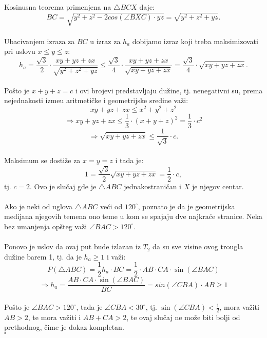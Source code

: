 \documentclass[11pt,letter]{article}
\begin{document}
\indent Kosinusna teorema primenjena na $\bigtriangleup BCX$ daje:
\\
$$BC=\sqrt{y^2+z^2-2cos(\angle BXC)\cdot yz}=\sqrt{y^2+z^2+yz}.$$
\\
\indent Ubacivanjem izraza za $BC$ u izraz za $h_a$ dobijamo izraz koji treba maksimizovati  pri uslovu $x\leqslant y\leqslant z$:
$$h_a=\frac{\sqrt3}{2}\cdot \frac{xy+yz+zx}{\sqrt{y^2+z^2+yz}}\leqslant \frac{\sqrt3}{4}\cdot \frac{xy+yz+zx}{\sqrt{xy+yz+zx}}=\frac{\sqrt3}{4}\cdot \sqrt{xy+yz+zx}.$$
\\
\indent Po\v sto je $x+y+z=c$ i ovi brojevi predstavljaju du\v zine, tj. nenegativni su, prema nejednakosti izme\dj u aritmeti\v cke i geometrijske sredine va\v zi:
$$xy+yz+zx\leqslant x^2+y^2+z^2$$
$$\Longrightarrow xy+yz+zx\leqslant \frac{1}{3}\cdot (x+y+z)^2=\frac{1}{3}\cdot c^2$$
$$\Longrightarrow \sqrt{xy+yz+zx}\leqslant \frac{1}{\sqrt3}\cdot c.$$
\\
\indent Maksimum se dosti\v ze za $x=y=z$ i tada je:
$$1=\frac{\sqrt3}{2}\sqrt{xy+yz+zx}=\frac{1}{2}\cdot c,$$
tj. $c=2$. Ovo je slu\v caj gde je $\bigtriangleup ABC$ jednakostrani\v can i $X$ je njegov centar.
\\
\\
\indent Ako je neki od uglova $\bigtriangleup ABC$ ve\' ci od $120^\circ$, poznato je da je geometrijska medijana njegovih temena ono teme u kom se spajaju dve najkra\' ce stranice. Neka bez umanjenja op\v steg va\v zi $\angle BAC>120^\circ$.
\\
\\
\indent Ponovo je uslov da ovaj put bude izlazan iz $T_2$ da su sve visine ovog trougla du\v zine barem 1, tj. da je $h_a\geqslant 1$ i va\v zi:
$$P(\bigtriangleup ABC)=\frac{1}{2} h_a \cdot BC=\frac{1}{2} \cdot AB\cdot CA \cdot \sin(\angle BAC)$$
$$\Longrightarrow h_a=\frac{ AB\cdot CA \cdot \sin(\angle BAC)}{BC}=sin(\angle CBA)\cdot AB\geqslant 1$$
\\
\indent Po\v sto je $\angle BAC>120^\circ$, tada je $\angle CBA<30^\circ$, tj. $\sin(\angle CBA)<\frac{1}{2}$, mora va\v ziti $AB>2$, te mora va\v ziti i $AB+CA>2$, te ovaj slu\v caj ne mo\v ze biti bolji od prethodnog, \v cime je dokaz kompletan.
\\
$\square$
\bigskip
\bigskip
\end{document}
